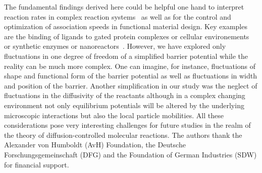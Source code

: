 \documentclass[preprint,superscriptaddress]{revtex4-1}
\begin{document}
The fundamental findings derived here could be helpful  one hand to interpret reaction rates in complex reaction systems~\cite{Calef1983, berg1985diffusion,kang,zwanzig} as
well as for the control and optimization of association speeds in functional material design. Key examples are the binding of ligands to gated protein complexes or
cellular environements~\cite{Szabo1982,greives,Setny2013, Mondal2013, noe} or synthetic enzymes or nanoreactors~\cite{Wu2012a}. However, we have explored only fluctuations in one degree
of freedom of  a simplified  barrier  potential while the reality can be much more complex. One  can imagine, for instance, 
fluctuations of shape and functional form of the barrier potential as well as fluctuations in width and position of the barrier. 
Another simplification in our study was the neglect of fluctuations in the diffusivity of the reactants although in a complex changing
environment not only equilibrium potentials will be altered by the underlying microscopic interactions but also the local
particle mobilities. All these considerations pose very interesting challenges for future studies in the realm of the theory of 
diffusion-controlled molecular reactions. 
\acknowledgments
The authors thank the Alexander von Humboldt (AvH) Foundation, the Deutsche Forschungsgemeinschaft (DFG) and the Foundation of German Industries (SDW) for financial support. 


\end{document}
